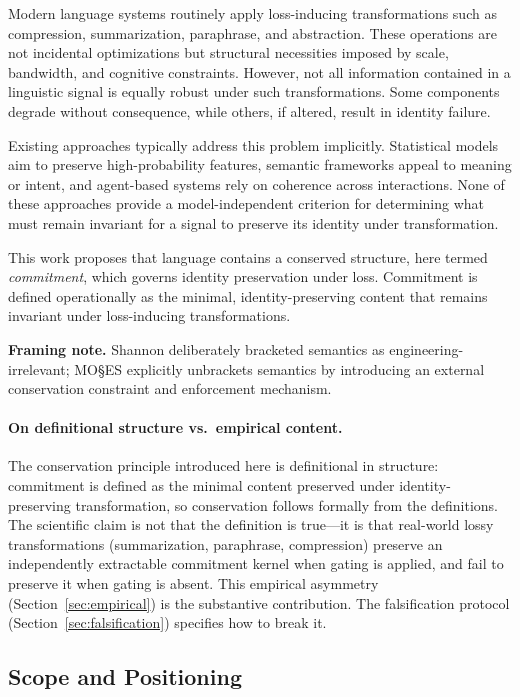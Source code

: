 \documentclass[11pt,a4paper]{article}
\begin{document}
Modern language systems routinely apply loss-inducing transformations such as compression, summarization, paraphrase, and abstraction. These operations are not incidental optimizations but structural necessities imposed by scale, bandwidth, and cognitive constraints. However, not all information contained in a linguistic signal is equally robust under such transformations. Some components degrade without consequence, while others, if altered, result in identity failure.

Existing approaches typically address this problem implicitly. Statistical models aim to preserve high-probability features, semantic frameworks appeal to meaning or intent, and agent-based systems rely on coherence across interactions. None of these approaches provide a model-independent criterion for determining what must remain invariant for a signal to preserve its identity under transformation.

This work proposes that language contains a conserved structure, here termed \emph{commitment}, which governs identity preservation under loss. Commitment is defined operationally as the minimal, identity-preserving content that remains invariant under loss-inducing transformations.

\noindent\textbf{Framing note.} Shannon deliberately bracketed semantics as engineering-irrelevant; MO\S{}ES\texttrademark{} explicitly unbrackets semantics by introducing an external conservation constraint and enforcement mechanism.

\paragraph{On definitional structure vs.\ empirical content.}
The conservation principle introduced here is definitional in structure: commitment is defined as the minimal content preserved under identity-preserving transformation, so conservation follows formally from the definitions. The scientific claim is not that the definition is true---it is that real-world lossy transformations (summarization, paraphrase, compression) preserve an independently extractable commitment kernel when gating is applied, and fail to preserve it when gating is absent. This empirical asymmetry (Section~\ref{sec:empirical}) is the substantive contribution. The falsification protocol (Section~\ref{sec:falsification}) specifies how to break it.

\subsection{Scope and Positioning}
\end{document}
